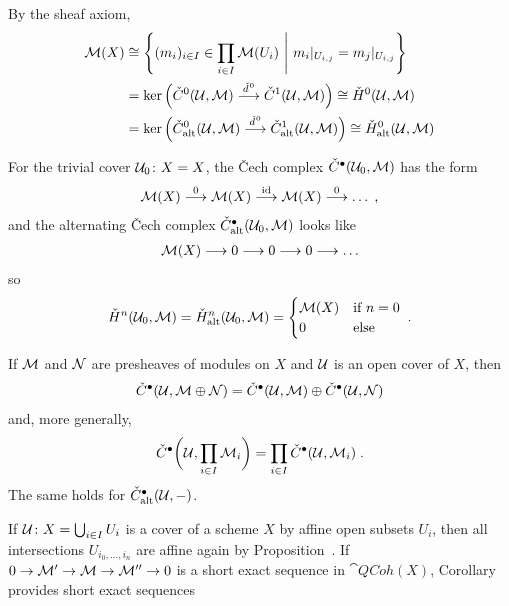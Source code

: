 \documentclass[a4paper,parskip=half,numbers=enddot, DIV=12]{scrreprt}
\newcommand{\vC}{\v{C}}
\begin{document}
\begin{example}
	\begin{alphanumerate}
		\item {}By the sheaf axiom, 
		\begin{align*}
			\Mm(X)&\cong\left\{(m_i)_{i\in I}\in\prod_{i\in I}\Mm(U_i)\st m_i|_{U_{i,j}}=m_j|_{U_{i,j}}\right\}\\
			&=\ker\Big(\check{C}^0(\Uu,\Mm)\morphism[\hacek{d}^0]\check{C}^1(\Uu,\Mm)\Big)\cong \check{H}^0(\Uu,\Mm)\\
			&=\ker\Big(\check{C}_\alt^0(\Uu,\Mm)\morphism[\hacek{d}^0]\check{C}_\alt^1(\Uu,\Mm)\Big)\cong \check{H}_\alt^0(\Uu,\Mm)
		\end{align*}
		\item For the trivial cover $\mathcal{U}_0\colon X=X$, the \vC ech complex $\check{C}^\bullet (\mathcal{U}_0,\mathcal{M})$ has the form
		\begin{align*}
		\Mm(X)\morphism[0]\Mm(X)\morphism[\id]\Mm(X)\morphism[0]\ldots\;,
		\end{align*}
		and the alternating \vC ech complex $\check{C}_{\mathrm{alt}}^\bullet (\mathcal{U}_0,\mathcal{M})$ looks like
		\begin{align*}
		\Mm(X)\morphism 0\morphism 0\morphism0\morphism\ldots
		\end{align*}
		so
		\begin{align*}
			\check{H}^n(\mathcal{U}_0,\mathcal{M})=\check{H}_{\mathrm{alt}}^n(\mathcal{U}_0,\mathcal{M})=\begin{cases}
				\mathcal{M}(X) & \text{if }n=0\\
				0 & \text{else}
			\end{cases}\;.
		\end{align*}
		\item If $\mathcal{M}$ and $\mathcal{N}$ are presheaves of modules on $X$ and $\mathcal{U}$ is an open cover of $X$, then 
		\begin{align*}
			\check{C}^\bullet (\mathcal{U},\mathcal{M}\oplus\mathcal{N})=\check{C}^\bullet (\mathcal{U},\mathcal{M})\oplus\check{C}^\bullet (\mathcal{U},\mathcal{N})
		\end{align*}
		and, more generally, 
		\begin{align*}
			\check{C}^\bullet \bigg(\mathcal{U},\prod_{i\in I}\mathcal{M}_i\bigg)=\prod_{i\in I}\check{C}^\bullet (\mathcal{U},\mathcal{M}_i)\;.
		\end{align*}
		The same holds for $\check{C}_{\mathrm{alt}}^\bullet (\mathcal{U},-)$.
	\end{alphanumerate}
\end{example}
If $\mathcal{U}\colon X=\bigcup_{i\in I}U_i$ is a cover of a scheme $X$ by affine open subsets $U_i$, then all intersections $U_{i_0,\ldots,i_n}$ are affine again by Proposition~. If $0\morphism\Mm'\morphism\Mm\morphism\Mm''\morphism 0$ is a short exact sequence in $\cat{QCoh}(X)$, Corollary~ provides short exact sequences
\end{document}
